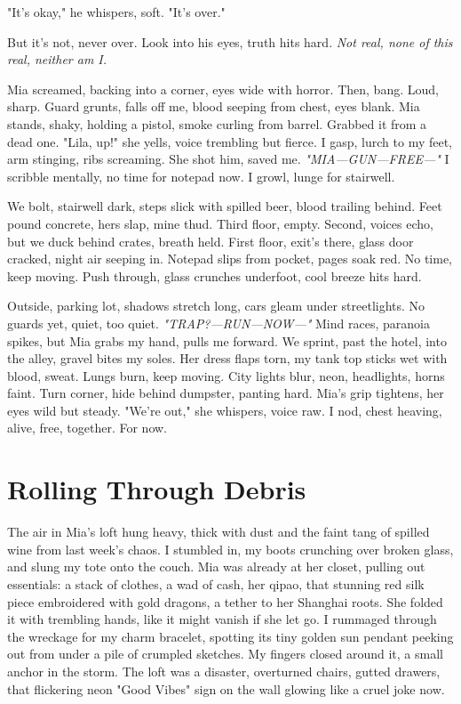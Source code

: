 \documentclass[12pt,oneside]{book} %
\begin{document}
"It’s okay," he whispers, soft. "It’s over."

But it’s not, never over. Look into his eyes, truth hits hard. \textit{Not real, none of this real, neither am I.}

Mia screamed, backing into a corner, eyes wide with horror. Then, bang. Loud, sharp. Guard grunts, falls off me, blood seeping from chest, eyes blank. Mia stands, shaky, holding a pistol, smoke curling from barrel. Grabbed it from a dead one. "\textnormal{Lila}, up!" she yells, voice trembling but fierce. I gasp, lurch to my feet, arm stinging, ribs screaming. She shot him, saved me. \textit{"MIA—GUN—FREE—"} I scribble mentally, no time for notepad now. I growl, lunge for stairwell.

We bolt, stairwell dark, steps slick with spilled beer, blood trailing behind. Feet pound concrete, hers slap, mine thud. Third floor, empty. Second, voices echo, but we duck behind crates, breath held. First floor, exit’s there, glass door cracked, night air seeping in. Notepad slips from pocket, pages soak red. No time, keep moving. Push through, glass crunches underfoot, cool breeze hits hard.

Outside, parking lot, shadows stretch long, cars gleam under streetlights. No guards yet, quiet, too quiet. \textit{"TRAP?—RUN—NOW—"} Mind races, paranoia spikes, but Mia grabs my hand, pulls me forward. We sprint, past the hotel, into the alley, gravel bites my soles. Her dress flaps torn, my tank top sticks wet with blood, sweat. Lungs burn, keep moving. City lights blur, neon, headlights, horns faint. Turn corner, hide behind dumpster, panting hard. Mia’s grip tightens, her eyes wild but steady. "We’re out," she whispers, voice raw. I nod, chest heaving, alive, free, together. For now.

\chapter{Rolling Through Debris}

The air in Mia’s loft hung heavy, thick with dust and the faint tang of spilled wine from last week’s chaos. I stumbled in, my boots crunching over broken glass, and slung my tote onto the couch. Mia was already at her closet, pulling out essentials: a stack of clothes, a wad of cash, her qipao, that stunning red silk piece embroidered with gold dragons, a tether to her Shanghai roots. She folded it with trembling hands, like it might vanish if she let go. I rummaged through the wreckage for my charm bracelet, spotting its tiny golden sun pendant peeking out from under a pile of crumpled sketches. My fingers closed around it, a small anchor in the storm. The loft was a disaster, overturned chairs, gutted drawers, that flickering neon "Good Vibes" sign on the wall glowing like a cruel joke now.
\end{document}

